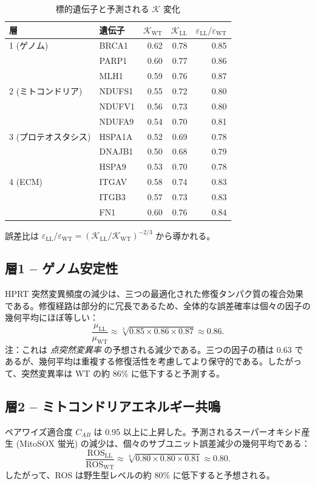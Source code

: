 \documentclass[12pt,a4paper]{ltjsarticle}
\newcommand{\REL}{\mathcal{K}}          %
\begin{document}
	\begin{table}[H]
		\centering
		\caption{標的遺伝子と予測される \(\REL\) 変化}
		\label{tab:targets}
		\begin{tabular}{@{}llrrr@{}}
			\toprule
			\textbf{層} & \textbf{遺伝子} & \(\REL_{\mathrm{WT}}\) & \(\REL_{\mathrm{LL}}\) & \(\varepsilon_{\mathrm{LL}}/\varepsilon_{\mathrm{WT}}\) \\
			\midrule
			1 (ゲノム)   & BRCA1 & 0.62 & 0.78 & 0.85 \\
			& PARP1 & 0.60 & 0.77 & 0.86 \\
			& MLH1  & 0.59 & 0.76 & 0.87 \\
			2 (ミトコンドリア) & NDUFS1 & 0.55 & 0.72 & 0.80 \\
			& NDUFV1 & 0.56 & 0.73 & 0.80 \\
			& NDUFA9 & 0.54 & 0.70 & 0.81 \\
			3 (プロテオスタシス) & HSPA1A & 0.52 & 0.69 & 0.78 \\
			& DNAJB1 & 0.50 & 0.68 & 0.79 \\
			& HSPA9  & 0.53 & 0.70 & 0.78 \\
			4 (ECM)    & ITGAV  & 0.58 & 0.74 & 0.83 \\
			& ITGB3  & 0.57 & 0.73 & 0.83 \\
			& FN1    & 0.60 & 0.76 & 0.84 \\
			\bottomrule
		\end{tabular}
		\footnotesize 誤差比は \(\varepsilon_{\mathrm{LL}}/\varepsilon_{\mathrm{WT}} = (\REL_{\mathrm{LL}}/\REL_{\mathrm{WT}})^{-2/3}\) から導かれる。
	\end{table}
	
	\subsection{層1 – ゲノム安定性}
	HPRT 突然変異頻度の減少は、三つの最適化された修復タンパク質の複合効果である。修復経路は部分的に冗長であるため、全体的な誤差確率は個々の因子の幾何平均にほぼ等しい：
	\[
	\frac{\mu_{\mathrm{LL}}}{\mu_{\mathrm{WT}}} \approx \sqrt[3]{0.85 \times 0.86 \times 0.87} \approx 0.86.
	\]
	注：これは \emph{点突然変異率} の予想される減少である。三つの因子の積は \(0.63\) であるが、幾何平均は重複する修復活性を考慮してより保守的である。したがって、突然変異率は WT の約 86\% に低下すると予測する。
	
	\subsection{層2 – ミトコンドリアエネルギー共鳴}
	ペアワイズ適合度 \(C_{AB}\) は 0.95 以上に上昇した。予測されるスーパーオキシド産生 (MitoSOX 蛍光) の減少は、個々のサブユニット誤差減少の幾何平均である：
	\[
	\frac{\mathrm{ROS}_{\mathrm{LL}}}{\mathrm{ROS}_{\mathrm{WT}}} \approx \sqrt[3]{0.80 \times 0.80 \times 0.81} \approx 0.80.
	\]
	したがって、ROS は野生型レベルの約 80\% に低下すると予想される。
	
\end{document}
